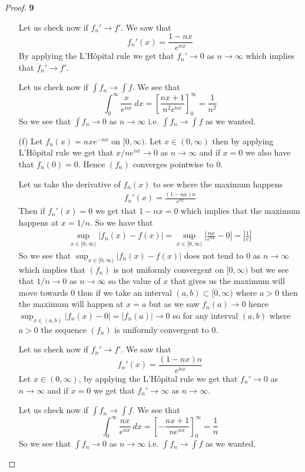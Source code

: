 \documentclass[11pt]{article}
\theoremstyle{definition}
\begin{document}
\begin{proof}{\textbf{9}}
\begin{itemize}
    Let us check now if $f_n' \to f'$. We saw that
    $$f_n'(x) = \frac{1 - nx}{e^{nx}}$$
    By applying the L'Hôpital rule we get that $f_n' \to 0$
    as $n \to \infty$ which implies that $f_n' \to f'$.

    Let us check now if $\int f_n \to \int f$. We see that
    $$\int_0^\infty \frac{x}{e^{nx}}~dx
    = \left[\frac{nx + 1}{n^2e^{nx}}\right]_{0}^\infty = \frac{1}{n^2}$$
    So we see that $\int f_n \to 0$ as $n \to \infty$ i.e. $\int f_n \to \int f$
    as we wanted.

    \cleardoublepage
    \item [(f)] Let $f_n(x) = nxe^{-nx}$ on $[0,\infty)$. Let $x \in (0,\infty)$
    then by applying L'Hôpital rule we get that
    $x/ne^{nx} \to 0$ as $n \to\infty$ and if $x=0$ we also have that $f_n(0)=0$.
    Hence $(f_n)$ converges pointwise to $0$.

    Let us take the derivative of $f_n(x)$ to see where the maximum happens
    \begin{align*}
        f_n'(x) = \frac{(1 - nx)n}{e^{nx}}
    \end{align*}
    Then if $f_n'(x) = 0$ we get that $1 - nx = 0$ which implies that the
    maximum happens at $x = 1/n$. So we have that
    \begin{align*}
        \sup_{x \in [0,\infty)} \left|f_n(x) - f(x)\right|
        = \sup_{x \in [0,\infty)} \left|\frac{nx}{e^{nx}} - 0\right|
        = \left|\frac{1}{e}\right|
    \end{align*}
    So we see that $\sup_{x \in [0,\infty)} \left|f_n(x) - f(x)\right|$ does
    not tend to $0$ as $n \to \infty$ which implies that $(f_n)$ is not
    uniformly convergent on $[0,\infty)$ but we see that $1/n \to 0$ as
    $n\to \infty$ so the value of $x$ that gives us the maximum will move
    towards $0$ thus if we take an interval $(a,b) \subset [0,\infty)$ where $a> 0$
    then the maximum will happen at $x=a$ but as we saw $f_n(a) \to 0$ hence
    $\sup_{x \in (a,b)} |f_n(x) - 0| = |f_n(a)|\to 0$ so for any interval
    $(a,b)$ where $a > 0$ the sequence $(f_n)$ is uniformly convergent to $0$.

    Let us check now if $f_n' \to f'$. We saw that
    $$f_n'(x) = \frac{(1 - nx)n}{e^{nx}}$$
    Let $x \in (0,\infty)$, by applying the L'Hôpital rule we get that
    $f_n' \to 0$ as $n \to \infty$ and if $x = 0$ we get that $f_n' \to \infty$
    as $n \to \infty$.

    Let us check now if $\int f_n \to \int f$. We see that
    $$\int_0^\infty \frac{nx}{e^{nx}}~dx
    = \left[-\frac{nx + 1}{ne^{nx}}\right]_{0}^\infty = \frac{1}{n}$$
    So we see that $\int f_n \to 0$ as $n \to \infty$ i.e. $\int f_n \to \int f$
    as we wanted.

\end{itemize}
\end{proof}
\end{document}
